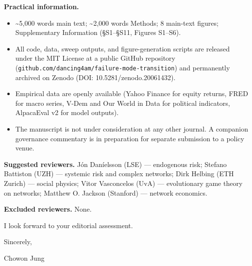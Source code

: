 \documentclass[10pt,letterpaper]{article}
\providecommand{\tightlist}{\setlength{\itemsep}{0pt}\setlength{\parskip}{0pt}}
\begin{document}
\textbf{Practical information.}

\begin{itemize}
\tightlist
\item
  \textasciitilde5,000 words main text; \textasciitilde2,000 words Methods; 8 main-text figures; Supplementary Information (§S1--§S11, Figures S1--S6).
\item
  All code, data, sweep outputs, and figure-generation scripts are released under the MIT License at a public GitHub repository (\texttt{github.com/dancing4am/failure-mode-transition}) and permanently archived on Zenodo (DOI: 10.5281/zenodo.20061432).
\item
  Empirical data are openly available (Yahoo Finance for equity returns, FRED for macro series, V-Dem and Our World in Data for political indicators, AlpacaEval v2 for model outputs).
\item
  The manuscript is not under consideration at any other journal. A companion governance commentary is in preparation for separate submission to a policy venue.
\end{itemize}

\textbf{Suggested reviewers.} Jón Daníelsson (LSE) --- endogenous risk; Stefano Battiston (UZH) --- systemic risk and complex networks; Dirk Helbing (ETH Zurich) --- social physics; Vitor Vasconcelos (UvA) --- evolutionary game theory on networks; Matthew O. Jackson (Stanford) --- network economics.

\textbf{Excluded reviewers.} None.

I look forward to your editorial assessment.

Sincerely,

Chowon Jung
\end{document}
